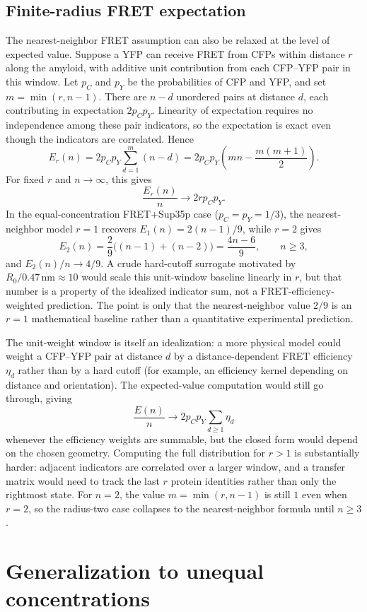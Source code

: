 \documentclass[referee,lineno,pdflatex,sn-mathphys-ay]{sn-jnl}
\begin{document}
\subsection{Finite-radius FRET expectation}

The nearest-neighbor FRET assumption can also be relaxed at the level of expected value. Suppose a YFP can receive FRET from CFPs within distance $r$ along the amyloid, with additive unit contribution from each CFP--YFP pair in this window. Let $p_C$ and $p_Y$ be the probabilities of CFP and YFP, and set $m=\min(r,n-1)$. There are $n-d$ unordered pairs at distance $d$, each contributing in expectation $2p_Cp_Y$. Linearity of expectation requires no independence among these pair indicators, so the expectation is exact even though the indicators are correlated. Hence
\[
E_r(n) = 2p_Cp_Y \sum_{d=1}^{m} (n-d)
= 2p_Cp_Y\left(mn-\frac{m(m+1)}{2}\right).
\]
For fixed $r$ and $n \to \infty$, this gives
\[
\frac{E_r(n)}{n} \longrightarrow 2r p_Cp_Y.
\]
In the equal-concentration FRET+Sup35p case ($p_C=p_Y=1/3$), the nearest-neighbor model $r=1$ recovers $E_1(n)=2(n-1)/9$, while $r=2$ gives
\[
E_2(n)=\frac{2}{9}\bigl((n-1)+(n-2)\bigr)=\frac{4n-6}{9}, \qquad n \ge 3,
\]
and $E_2(n)/n \to 4/9$. A crude hard-cutoff surrogate motivated by $R_0/0.47\,\text{nm} \approx 10$ would scale this unit-window baseline linearly in $r$, but that number is a property of the idealized indicator sum, not a FRET-efficiency-weighted prediction. The point is only that the nearest-neighbor value $2/9$ is an $r=1$ mathematical baseline rather than a quantitative experimental prediction.

The unit-weight window is itself an idealization: a more physical model could weight a CFP--YFP pair at distance $d$ by a distance-dependent FRET efficiency $\eta_d$ rather than by a hard cutoff (for example, an efficiency kernel depending on distance and orientation). The expected-value computation would still go through, giving
\[
\frac{E(n)}{n} \longrightarrow 2p_Cp_Y\sum_{d \ge 1} \eta_d
\]
whenever the efficiency weights are summable, but the closed form would depend on the chosen geometry. Computing the full distribution for $r>1$ is substantially harder: adjacent indicators are correlated over a larger window, and a transfer matrix would need to track the last $r$ protein identities rather than only the rightmost state.
For $n=2$, the value $m=\min(r,n-1)$ is still $1$ even when $r=2$, so the radius-two case collapses to the nearest-neighbor formula until $n \ge 3$.

\section{Generalization to unequal concentrations}\label{sec:unequal}
\end{document}
